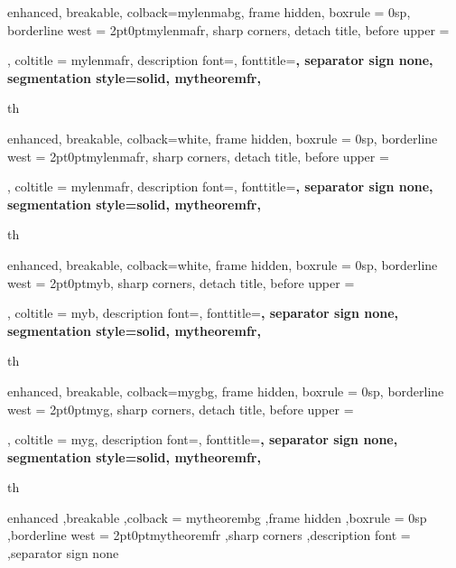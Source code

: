 {
	enhanced,
	breakable,
	colback=mylenmabg,
	frame hidden,
	boxrule = 0sp,
	borderline west = {2pt}{0pt}{mylenmafr},
	sharp corners,
	detach title,
	before upper = \tcbtitle\par\smallskip,
	coltitle = mylenmafr,
	description font=\mdseries{}\selectfont,
	fonttitle=\selectfont\bfseries,
	separator sign none,
	segmentation style={solid, mytheoremfr},
}
{th}


{
	enhanced,
	breakable,
	colback=white,
	frame hidden,
	boxrule = 0sp,
	borderline west = {2pt}{0pt}{mylenmafr},
	sharp corners,
	detach title,
	before upper = \tcbtitle\par\smallskip,
	coltitle = mylenmafr,
	description font=\selectfont,
	fonttitle=\selectfont\bfseries,
	separator sign none,
	segmentation style={solid, mytheoremfr},
}
{th}


{
	enhanced,
	breakable,
	colback=white,
	frame hidden,
	boxrule = 0sp,
	borderline west = {2pt}{0pt}{myb},
	sharp corners,
	detach title,
	before upper = \tcbtitle\par\smallskip,
	coltitle = myb,
	description font=\mdseries{}\selectfont,
	fonttitle=\selectfont\bfseries,
	separator sign none,
	segmentation style={solid, mytheoremfr},
}
{th}


{
	enhanced,
	breakable,
	colback=mygbg,
	frame hidden,
	boxrule = 0sp,
	borderline west = {2pt}{0pt}{myg},
	sharp corners,
	detach title,
	before upper = \tcbtitle\par\smallskip,
	coltitle = myg,
	description font=\mdseries{}\selectfont,
	fonttitle=\selectfont\bfseries,
	separator sign none,
	segmentation style={solid, mytheoremfr},
}
{th}



{%
	enhanced
	,breakable
	,colback = mytheorembg
	,frame hidden
	,boxrule = 0sp
	,borderline west = {2pt}{0pt}{mytheoremfr}
	,sharp corners
	,description font = \mdseries
	,separator sign none
}

